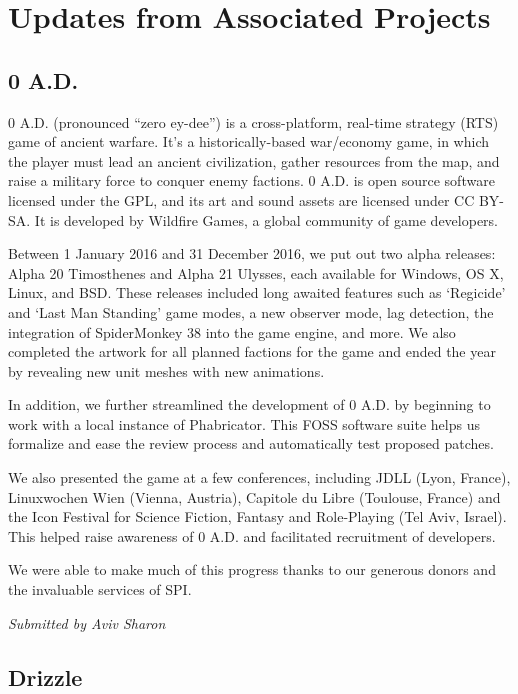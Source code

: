 \documentclass[letterpaper]{report}
\begin{document}
\section{Updates from Associated Projects}

\subsection{0 A.D.}

0 A.D. (pronounced ``zero ey-dee'') is a cross-platform, real-time
strategy (RTS) game of ancient warfare. It's a historically-based
war/economy game, in which the player must lead an ancient civilization,
gather resources from the map, and raise a military force to conquer
enemy factions. 0 A.D. is open source software licensed under the GPL,
and its art and sound assets are licensed under CC BY-SA. It is
developed by Wildfire Games, a global community of game developers.

Between 1 January 2016 and 31 December 2016, we put out two alpha
releases: Alpha 20 Timosthenes and Alpha 21 Ulysses, each available for
Windows, OS X, Linux, and BSD. These releases included long awaited
features such as `Regicide' and `Last Man Standing' game modes, a new
observer mode, lag detection, the integration of SpiderMonkey 38 into
the game engine, and more. We also completed the artwork for all planned
factions for the game and ended the year by revealing new unit meshes
with new animations.

In addition, we further streamlined the development of 0 A.D. by
beginning to work with a local instance of Phabricator. This FOSS
software suite helps us formalize and ease the review process and
automatically test proposed patches.

We also presented the game at a few conferences, including JDLL (Lyon,
France), Linuxwochen Wien (Vienna, Austria), Capitole du Libre
(Toulouse, France) and the Icon Festival for Science Fiction, Fantasy
and Role-Playing (Tel Aviv, Israel). This helped raise awareness of 0
A.D. and facilitated recruitment of developers.

We were able to make much of this progress thanks to our generous donors
and the invaluable services of SPI.

{\em Submitted by Aviv Sharon}

\subsection{Drizzle}
\end{document}
